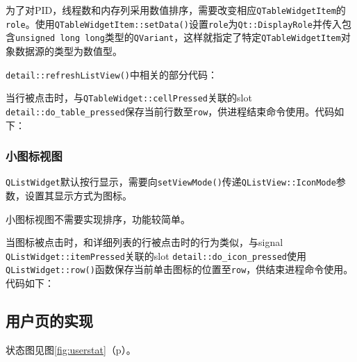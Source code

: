 \documentclass[UTF8,twoside,titlepage]{ctexart}
\newcommand\code[1]{\texttt{#1}}
\newcommand\myref[1]{\ref{#1}（p\pageref{#1}）}
\begin{document}
为了对PID，线程数和内存列采用数值排序，需要改变相应\code{QTableWidgetItem}的\code{role}。使用\code{QTableWidgetItem::setData()}设置\code{role}为\code{Qt::DisplayRole}并传入包含\code{unsigned long long}类型的\code{QVariant}，这样就指定了特定\code{QTableWidgetItem}对象数据源的类型为数值型。

\code{detail::refreshListView()}中相关的部分代码：

{
    \ttfamily
    
}

当行被点击时，与\code{QTableWidget::cellPressed}关联的slot \code{detail::do\_table\_pressed}保存当前行数至\code{row}，供进程结束命令使用。代码如下：

{
    \ttfamily
    
}

\subsubsection{小图标视图}
\code{QListWidget}默认按行显示，需要向\code{setViewMode()}传递\code{QListView::IconMode}参数，设置其显示方式为图标。

小图标视图不需要实现排序，功能较简单。

当图标被点击时，和详细列表的行被点击时的行为类似，与signal \code{QListWidget::itemPressed}关联的slot \code{detail::do\_icon\_pressed}使用\code{QListWidget::row()}函数保存当前单击图标的位置至\code{row}，供结束进程命令使用。代码如下：

{
    \ttfamily
    
}

\subsection{用户页的实现}
状态图见图\myref{fig:userstat}。
\end{document}
